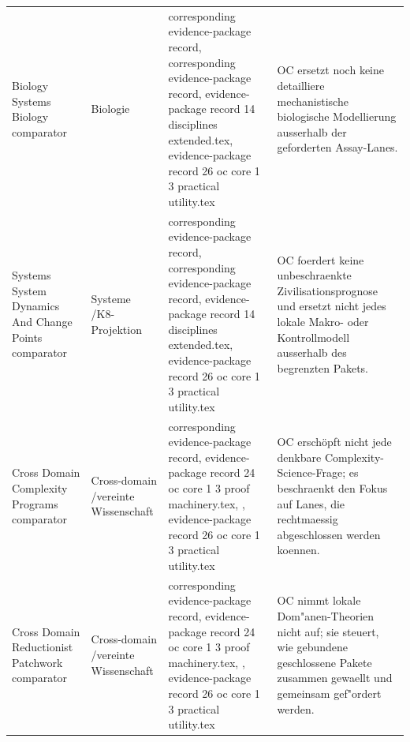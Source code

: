 \begin{longtable}{@{}L{0.20\textwidth}L{0.11\textwidth}L{0.33\textwidth}L{0.28\textwidth}@{}}
Biology Systems Biology comparator & Biologie & corresponding evidence-package record, corresponding evidence-package record, \allowbreak evidence-package record 14 disciplines extended.tex, \allowbreak evidence-package record 26 oc core 1 3 practical utility.tex & OC ersetzt noch keine detailliere mechanistische biologische Modellierung ausserhalb der geforderten Assay-Lanes. \\
Systems System Dynamics And Change Points comparator & Systeme /\allowbreak K8-Projektion & corresponding evidence-package record, corresponding evidence-package record, \allowbreak evidence-package record 14 disciplines extended.tex, \allowbreak evidence-package record 26 oc core 1 3 practical utility.tex & OC foerdert keine unbeschraenkte Zivilisationsprognose und ersetzt nicht jedes lokale Makro- oder Kontrollmodell ausserhalb des begrenzten Pakets. \\
Cross Domain Complexity Programs comparator & Cross-domain /\allowbreak vereinte Wissenschaft & corresponding evidence-package record, \allowbreak evidence-package record 24 oc core 1 3 proof machinery.tex, \allowbreak {}, \allowbreak evidence-package record 26 oc core 1 3 practical utility.tex & OC erschöpft nicht jede denkbare Complexity-Science-Frage; es beschraenkt den Fokus auf Lanes, die rechtmaessig abgeschlossen werden koennen. \\
Cross Domain Reductionist Patchwork comparator & Cross-domain /\allowbreak vereinte Wissenschaft & corresponding evidence-package record, \allowbreak evidence-package record 24 oc core 1 3 proof machinery.tex, \allowbreak {}, \allowbreak evidence-package record 26 oc core 1 3 practical utility.tex & OC nimmt lokale Dom"anen-Theorien nicht auf; sie steuert, wie gebundene geschlossene Pakete zusammen gewaellt und gemeinsam gef"ordert werden. \\
\bottomrule
\end{longtable}

